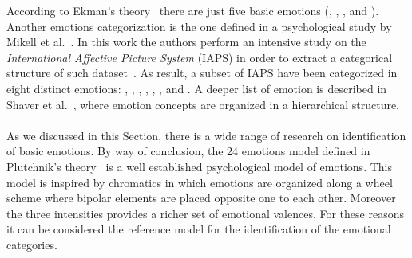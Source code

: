 According to Ekman's theory~\cite{ekman1987universals} there are just five basic emotions (, , ,  and ).
Another emotions categorization is the one defined in a psychological study by Mikell et al.~\cite{mikels2005emotional}. In this work the authors perform an intensive study on the \textit{International Affective Picture System} (IAPS) in order to extract a categorical structure of such dataset~\cite{lang1999international}. As result, a subset of IAPS have been categorized in eight distinct emotions: , , , , , ,  and .
A deeper list of emotion is described in Shaver et al.~\cite{shaver1987emotion}, where emotion concepts are organized in a hierarchical structure.
\\
\\
As we discussed in this Section, there is a wide range of research on identification of basic emotions. By way of conclusion, the 24 emotions model defined in Plutchnik's theory~\cite{plutchik1980general} is a well established psychological model of emotions. This model is inspired by chromatics in which emotions are organized along a wheel scheme where bipolar elements are placed opposite one to each other. Moreover the three intensities provides a richer set of emotional valences. For these reasons it can be considered the reference model for the identification of the emotional categories.

